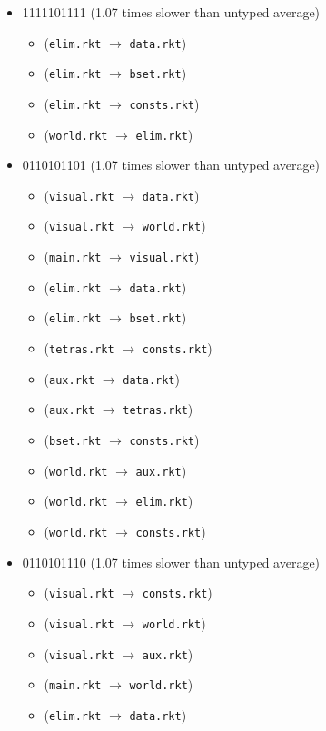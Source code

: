 \documentclass{article}
\newcommand{\mono}[1]{\texttt{#1}}
\begin{document}
\begin{itemize}
\item 1111101111 (1.07 times slower than untyped average)
  \begin{itemize}
  \item (\mono{elim.rkt} $\rightarrow$ \mono{data.rkt})
  \item (\mono{elim.rkt} $\rightarrow$ \mono{bset.rkt})
  \item (\mono{elim.rkt} $\rightarrow$ \mono{consts.rkt})
  \item (\mono{world.rkt} $\rightarrow$ \mono{elim.rkt})
  \end{itemize}
\item 0110101101 (1.07 times slower than untyped average)
  \begin{itemize}
  \item (\mono{visual.rkt} $\rightarrow$ \mono{data.rkt})
  \item (\mono{visual.rkt} $\rightarrow$ \mono{world.rkt})
  \item (\mono{main.rkt} $\rightarrow$ \mono{visual.rkt})
  \item (\mono{elim.rkt} $\rightarrow$ \mono{data.rkt})
  \item (\mono{elim.rkt} $\rightarrow$ \mono{bset.rkt})
  \item (\mono{tetras.rkt} $\rightarrow$ \mono{consts.rkt})
  \item (\mono{aux.rkt} $\rightarrow$ \mono{data.rkt})
  \item (\mono{aux.rkt} $\rightarrow$ \mono{tetras.rkt})
  \item (\mono{bset.rkt} $\rightarrow$ \mono{consts.rkt})
  \item (\mono{world.rkt} $\rightarrow$ \mono{aux.rkt})
  \item (\mono{world.rkt} $\rightarrow$ \mono{elim.rkt})
  \item (\mono{world.rkt} $\rightarrow$ \mono{consts.rkt})
  \end{itemize}
\item 0110101110 (1.07 times slower than untyped average)
  \begin{itemize}
  \item (\mono{visual.rkt} $\rightarrow$ \mono{consts.rkt})
  \item (\mono{visual.rkt} $\rightarrow$ \mono{world.rkt})
  \item (\mono{visual.rkt} $\rightarrow$ \mono{aux.rkt})
  \item (\mono{main.rkt} $\rightarrow$ \mono{world.rkt})
  \item (\mono{elim.rkt} $\rightarrow$ \mono{data.rkt})

\end{itemize}
\end{itemize}
\end{document}
